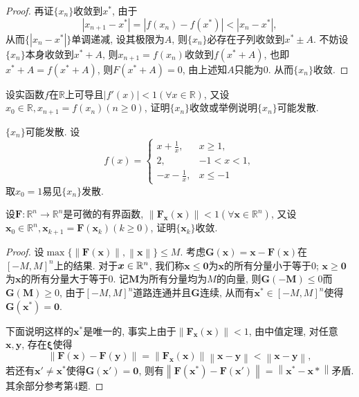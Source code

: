 \begin{quizb}
\begin{proof}
再证\(\{x_n\}\)收敛到\(x^*\), 由于\[\left|x_{n+1}-x^*\right|=\left|f(x_n)-f(x^*)\right|<\left|x_n-x^*\right|,\]从而\(\{|x_n-x^*|\}\)单调递减, 设其极限为\(A\), 则\(\{x_n\}\)必存在子列收敛到\(x^*\pm A\). 不妨设\(\{x_n\}\)本身收敛到\(x^*+A\), 则\(x_{n+1}=f(x_n)\)收敛到\(f(x^*+A)\), 也即\(x^*+A=f(x^*+A)\), 则\(F(x^*+A)=0\), 由上述知\(A\)只能为0. 从而\(\{x_n\}\)收敛.
\end{proof}
\woe 设实函数\(f\)在\(\mathbb{R}\)上可导且\(|f'(x)|<1(\forall x\in\mathbb{R})\), 又设\(x_0\in\mathbb{R},x_{n+1}=f(x_n)(n\geqslant 0)\), 证明\(\{x_n\}\)收敛或举例说明\(\{x_n\}\)可能发散.
\begin{solution}
\(\{x_n\}\)可能发散. 设\[f(x)=\begin{cases}
x+\frac{1}{x},&x\geqslant 1,\\
2,&-1<x<1,\\
-x-\frac{1}{x},&x\leqslant -1
\end{cases}\]
取\(x_0=1\)易见\(\{x_n\}\)发散.
\end{solution}
\woe 设\(\boldsymbol{F}:\mathbb{R}^n\rightarrow\mathbb{R}^n\)是可微的有界函数, \(\left\| \boldsymbol{F_x}(\boldsymbol{x})\right\|<1(\forall\boldsymbol{x}\in\mathbb{R}^n)\), 又设\(\boldsymbol{x}_0\in\mathbb{R}^n,\boldsymbol{x}_{k+1}=\boldsymbol{F}(\boldsymbol{x}_k)(k\geqslant 0)\), 证明\(\{\boldsymbol{x}_k\}\)收敛.
\begin{proof}
设\(\max\{\left\|\boldsymbol{F}(\boldsymbol{x})\right\|,\left\|\boldsymbol{x}\right\|\}\leqslant M\). 考虑\(\boldsymbol{G}(\boldsymbol{x})=\boldsymbol{x}-\boldsymbol{F}(\boldsymbol{x})\)在\([-M,M]^n\)上的结果. 对于\(\boldsymbol{x}\in\mathbb{R}^n\), 我们称\(\boldsymbol{x}\leqslant \boldsymbol{0}\)为\(\boldsymbol{x}\)的所有分量小于等于\(0\); \(\boldsymbol{x}\geqslant \boldsymbol{0}\)为\(\boldsymbol{x}\)的所有分量大于等于\(0\). 记\(\boldsymbol{M}\)为所有分量均为\(M\)的向量, 则\(\boldsymbol{G}(-\boldsymbol{M})\leqslant 0\)而\(\boldsymbol{G}(\boldsymbol{M})\geqslant 0\), 由于\([-M,M]^n\)道路连通并且\(\boldsymbol{G}\)连续, 从而有\(\boldsymbol{x^*}\in[-M,M]^n\)使得\(\boldsymbol{G}(\boldsymbol{x^*})=\boldsymbol{0}\).

下面说明这样的\(\boldsymbol{x^*}\)是唯一的, 事实上由于\(\left\| \boldsymbol{F_x}(\boldsymbol{x})\right\|<1\), 由中值定理, 对任意\(\boldsymbol{x},\boldsymbol{y}\), 存在\(\boldsymbol{\xi}\)使得\[\left\|\boldsymbol{F}(\boldsymbol{x})-\boldsymbol{F}(\boldsymbol{y})\right\|=\left\| \boldsymbol{F_x}(\boldsymbol{x})\right\|\left\|\boldsymbol{x}-\boldsymbol{y}\right\|<\left\|\boldsymbol{x}-\boldsymbol{y}\right\|,\]
若还有\(\boldsymbol{x'}\ne\boldsymbol{x^*}\)使得\(\boldsymbol{G}(\boldsymbol{x'})=\boldsymbol{0}\), 则有\(\left\|\boldsymbol{F}(\boldsymbol{x^*})-\boldsymbol{F}(\boldsymbol{x'})\right\|=\left\|\boldsymbol{x^*}-\boldsymbol{x*}\right\|\)矛盾. 其余部分参考第4题.
\end{proof}
\end{quizb}

